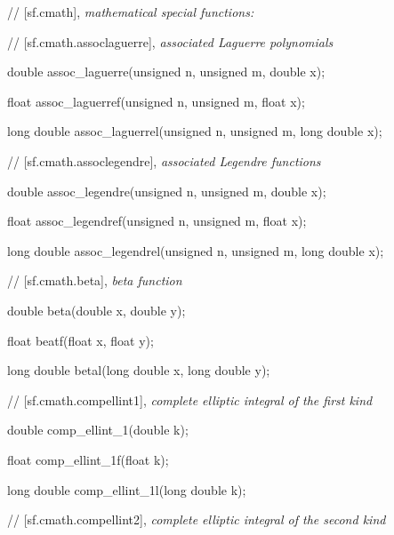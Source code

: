 // [sf.cmath], {\it mathematical special functions:}

\vspace{2ex}

// [sf.cmath.assoc\bigund laguerre], {\it associated Laguerre polynomials}

\vspace{2ex}

 double assoc\_laguerre(unsigned n, unsigned m, double x);
	
 float assoc\_laguerref(unsigned n, unsigned m, float x);
	
 long double assoc\_laguerrel(unsigned n, unsigned m, long double x);

\vspace{2ex}

// [sf.cmath.assoc{\bigund}legendre], {\it associated Legendre functions}

\vspace{2ex}

 double assoc\_legendre(unsigned n, unsigned m, double x);
	
 float assoc\_legendref(unsigned n, unsigned m, float x);
	
 long double assoc\_legendrel(unsigned n, unsigned m, long double x);

\vspace{2ex}

// [sf.cmath.beta], {\it beta function}

\vspace{2ex}

 double beta(double x, double y);
	
 float beatf(float x, float y);
	
 long double betal(long double x, long double y);

\vspace{2ex}
// [sf.cmath.comp{\bigund}ellint{\bigund}1], {\it complete elliptic integral of the first kind}
\vspace{2ex}

 double comp\_ellint\_1(double k);
	
 float comp\_ellint\_1f(float k);
	
 long double comp\_ellint\_1l(long double k);

\vspace{2ex}
// [sf.cmath.comp{\bigund}ellint{\bigund}2], {\it complete elliptic integral of the second kind}
\vspace{2ex}

